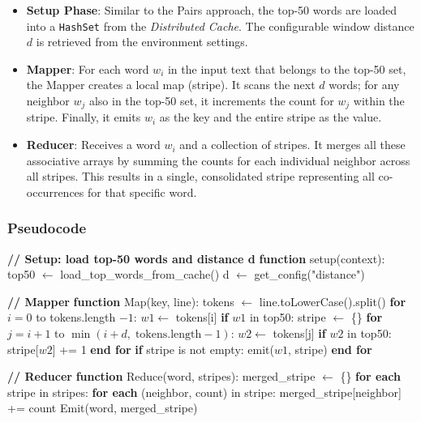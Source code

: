 \documentclass[12pt,a4paper]{article}
\begin{document}
\begin{itemize}
    \item \textbf{Setup Phase}: Similar to the Pairs approach, the top-50 words are loaded into a \texttt{HashSet} from the \textit{Distributed Cache}. The configurable window distance $d$ is retrieved from the environment settings.
    \item \textbf{Mapper}: For each word $w_i$ in the input text that belongs to the top-50 set, the Mapper creates a local map (stripe). It scans the next $d$ words; for any neighbor $w_j$ also in the top-50 set, it increments the count for $w_j$ within the stripe. Finally, it emits $w_i$ as the key and the entire stripe as the value.
    \item \textbf{Reducer}: Receives a word $w_i$ and a collection of stripes. It merges all these associative arrays by summing the counts for each individual neighbor across all stripes. This results in a single, consolidated stripe representing all co-occurrences for that specific word.
\end{itemize}

\subsubsection{Pseudocode}

\begin{algorithm}
\caption{Co-occurring Word Matrix --- Stripes Approach}
\begin{algorithmic}[1]

\State \textbf{// Setup: load top-50 words and distance d}
\State \textbf{function} setup(context):
\State \quad top50 $\gets$ load\_top\_words\_from\_cache()
\State \quad d $\gets$ get\_config("distance")

\vspace{0.5em}
\State \textbf{// Mapper}
\State \textbf{function} Map(key, line):
\State \quad tokens $\gets$ line.toLowerCase().split()
\State \quad \textbf{for} $i = 0$ to tokens.length $- 1$:
\State \qquad $w1 \gets$ tokens[i]
\State \qquad \textbf{if} $w1$ in top50:
\State \qquad\quad stripe $\gets$ \{\} 
\State \qquad\quad \textbf{for} $j = i + 1$ to $\min(i + d,\; \text{tokens.length} - 1)$:
\State \qquad\qquad $w2 \gets$ tokens[j]
\State \qquad\qquad \textbf{if} $w2$ in top50:
\State \qquad\qquad\quad stripe[$w2$] += 1
\State \qquad\quad \textbf{end for}
\State \qquad\quad \textbf{if} stripe is not empty:
\State \qquad\qquad emit($w1$, stripe)
\State \quad \textbf{end for}

\vspace{0.5em}
\State \textbf{// Reducer}
\State \textbf{function} Reduce(word, stripes):
\State \quad merged\_stripe $\gets$ \{\}
\State \quad \textbf{for each} stripe in stripes:
\State \qquad \textbf{for each} (neighbor, count) in stripe:
\State \qquad\quad merged\_stripe[neighbor] += count
\State \quad Emit(word, merged\_stripe)

\end{algorithmic}
\end{algorithm}
\end{document}

